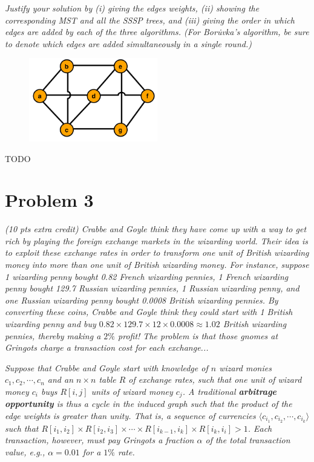 \documentclass[12pt]{article} \setlength{\oddsidemargin}{0in}
\begin{document}
\textit{Justify your solution by (i) giving the edges weights, (ii) showing the corresponding
MST and all the SSSP trees, and (iii) giving the order in which edges are added by
each of the three algorithms. (For Boru̇vka’s algorithm, be sure to denote which edges
are added simultaneously in a single round.)}

\begin{figure}[h]
  \centering \includegraphics[width=0.5\textwidth]{P2}
\end{figure}


TODO

\newpage

\section*{Problem 3}

\textit{(10 pts extra credit) Crabbe and Goyle think they have come up with a way to get
rich by playing the foreign exchange markets in the wizarding world. Their idea is
to exploit these exchange rates in order to transform one unit of British wizarding
money into more than one unit of British wizarding money. For instance, suppose
1 wizarding penny bought 0.82 French wizarding pennies, 1 French wizarding penny
bought 129.7 Russian wizarding pennies, 1 Russian wizarding penny, and one Russian
wizarding penny bought 0.0008 British wizarding pennies. By converting these coins,
Crabbe and Goyle think they could start with 1 British wizarding penny and buy
$0.82 \times 129.7 \times 12 \times 0.0008 \approx 1.02$ British wizarding pennies, thereby making a $2\%$
profit! The problem is that those gnomes at Gringots charge a transaction cost for
each exchange...}

\textit{Suppose that Crabbe and Goyle start with knowledge of $n$ wizard monies $c_1, c_2, \cdots, c_n$
and an $n \times n$ table $R$ of exchange rates, such that one unit of wizard money $c_i$ buys
$R[i, j]$ units of wizard money $c_j$. A traditional \textbf{arbitrage opportunity} is thus a cycle
in the induced graph such that the product of the edge weights is greater than unity.
That is, a sequence of currencies $\langle c_{i_{1}}, c_{i_{2}} , \cdots , c_{i_{k}} \rangle$ such that $R[i_1, i_2] \times R[i_2, i_3] \times \cdots \times R[i_{k−1}, i_k] \times R[i_k, i_i] > 1$. Each transaction, however, must pay Gringots a fraction $\alpha$ of the total transaction value, e.g., $\alpha = 0.01$ for a $1\%$ rate.}
\end{document}
